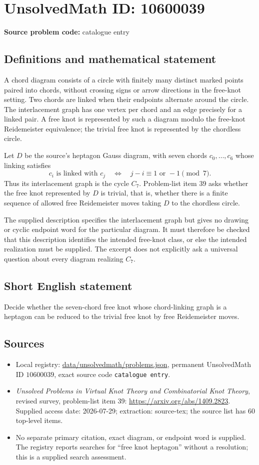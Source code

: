 \documentclass[11pt]{article}
\begin{document}
\section*{UnsolvedMath ID: 10600039}
\textbf{Source problem code:} catalogue entry
\subsection{Definitions and mathematical statement}
A chord diagram consists of a circle with finitely many distinct marked points paired into chords, without crossing signs or arrow directions in the free-knot setting. Two chords are linked when their endpoints alternate around the circle. The interlacement graph has one vertex per chord and an edge precisely for a linked pair. A free knot is represented by such a diagram modulo the free-knot Reidemeister equivalence; the trivial free knot is represented by the chordless circle.

Let $D$ be the source's heptagon Gauss diagram, with seven chords $c_0,\ldots,c_6$ whose linking satisfies
\[
 c_i\text{ is linked with }c_j
 \quad\Longleftrightarrow\quad j-i\equiv 1\text{ or }-1\pmod 7.
\]
Thus its interlacement graph is the cycle $C_7$. Problem-list item 39 asks whether the free knot represented by $D$ is trivial, that is, whether there is a finite sequence of allowed free Reidemeister moves taking $D$ to the chordless circle.

The supplied description specifies the interlacement graph but gives no drawing or cyclic endpoint word for the particular diagram. It must therefore be checked that this description identifies the intended free-knot class, or else the intended realization must be supplied. The excerpt does not explicitly ask a universal question about every diagram realizing $C_7$.
\subsection{Short English statement}
Decide whether the seven-chord free knot whose chord-linking graph is a heptagon can be reduced to the trivial free knot by free Reidemeister moves.
\subsection{Sources}
\begin{itemize}
\item Local registry: \url{data/unsolvedmath/problems.json}, permanent UnsolvedMath ID $10600039$, exact source code \texttt{catalogue entry}.
\item \emph{Unsolved Problems in Virtual Knot Theory and Combinatorial Knot Theory}, revised survey, problem-list item 39: \url{https://arxiv.org/abs/1409.2823}. Supplied access date: 2026-07-29; extraction: source-tex; the source list has 60 top-level items.
\item No separate primary citation, exact diagram, or endpoint word is supplied. The registry reports searches for ``free knot heptagon'' without a resolution; this is a supplied search assessment.
\end{itemize}
\end{document}
